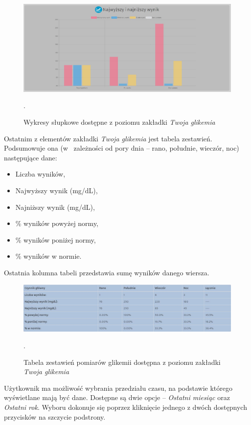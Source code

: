 \begin{figure}[h]
	\centering\includegraphics[scale=0.35]{images/normal_chart.jpg}
	\caption{Wykresy słupkowe dostępne z poziomu zakładki \textit{Twoja glikemia}}.
	\label{Rys:normalChart}
\end{figure}

Ostatnim z elementów zakładki \textit{Twoja glikemia} jest tabela zestawień. Podsumowuje ona (w~ zależności od pory dnia -- rano, południe, wieczór, noc) następujące dane: 

\begin{itemize}
	\item Liczba wyników, 
	\item Najwyższy wynik (mg/dL),
	\item Najniższy wynik (mg/dL),
	\item \% wyników powyżej normy,
	\item \% wyników poniżej normy,
	\item \% wyników w normie.
\end{itemize}

Ostatnia kolumna tabeli przedstawia sumę wyników danego wiersza. 

\begin{figure}[h]
	\centering\includegraphics[scale=0.5]{images/table.jpg}
	\caption{Tabela zestawień pomiarów glikemii dostępna z poziomu zakładki \textit{Twoja glikemia}}.
	\label{Rys:table}
\end{figure}

Użytkownik ma możliwość wybrania przedziału czasu, na podstawie którego wyświetlane mają być dane. Dostępne są dwie opcje -- \textit{Ostatni miesiąc} oraz \textit{Ostatni rok}. Wyboru dokonuje się poprzez kliknięcie jednego z dwóch dostępnych przycisków na szczycie podstrony.

